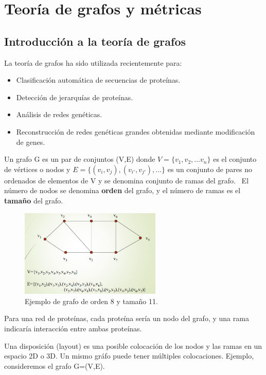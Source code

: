 \chapter{Teoría de grafos y métricas}
\section{Introducción a la teoría de grafos}
La teoría de grafos ha sido utilizada recientemente para:
\begin{itemize}
\item Clasificación automática de secuencias de proteínas.
\item Detección de jerarquías de proteínas.
\item Análisis de redes genéticas.
\item Reconstrucción de redes genéticas grandes obtenidas mediante modificación de genes.
\end{itemize}

Un grafo G es un par de conjuntos (V,E) donde $V = \{v_1, v_2, \ldots v_n\}$ es el conjunto de vértices o nodos y $E = \{(v_i, v_j), (v_{i'}, v_{j'}), \ldots \}$ es un conjunto de pares no ordenados de elementos de V y se denomina conjunto de ramas del grafo. 
  \
El número de nodos se denomina \textbf{orden} del grafo, y el número de ramas es el \textbf{tamaño} del grafo. 

\begin{figure}[h]
\centering
\includegraphics[width = 0.6\textwidth]{figs/grafo.png}
\caption{Ejemplo de grafo de orden 8 y tamaño 11.}
\end{figure}

Para una red de proteínas, cada proteína sería un nodo del grafo, y una rama indicaría interacción entre ambas proteínas. 

Una disposición (layout) es una posible colocación de los nodos y las ramas en un espacio 2D o 3D. Un mismo gráfo puede tener múltiples colocaciones. Ejemplo, consideremos el grafo G=(V,E).

